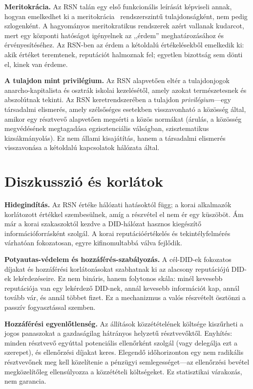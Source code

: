 \documentclass[11pt,a4paper,twocolumn]{article}
\begin{document}
\textbf{Meritokrácia.} Az RSN talán egy első funkcionális leírását képviseli annak, hogyan emelkedhet ki a meritokrácia~\cite{young1958} rendszerszintű tulajdonságként, nem pedig szlogenként. A hagyományos meritokratikus rendszerek azért vallanak kudarcot, mert egy központi hatóságot igényelnek az ,,érdem'' meghatározásához és érvényesítéséhez. Az RSN-ben az érdem a kétoldalú értékelésekből emelkedik ki: akik értéket teremtenek, reputációt halmoznak fel; egyetlen bizottság sem dönti el, kinek van érdeme.

\textbf{A tulajdon mint privilégium.} Az RSN alapvetően eltér a tulajdonjogok anarcho-kapitalista és osztrák iskolai kezelésétől, amely azokat természetesnek és abszolútnak tekinti. Az RSN keretrendszerében a tulajdon \emph{privilégium}---egy társadalmi elismerés, amely szélsőséges esetekben visszavonható a közösség által, amikor egy résztvevő alapvetően megsérti a közös normákat (árulás, a közösség megvédésének megtagadása egzisztenciális válságban, szisztematikus kizsákmányolás). Ez nem állami kisajátítás, hanem a társadalmi elismerés visszavonása a kétoldalú kapcsolatok hálózata által.

\section{Diszkusszió és korlátok}

\textbf{Hidegindítás.} Az RSN értéke hálózati hatásoktól függ; a korai alkalmazók korlátozott értékkel szembesülnek, amíg a részvétel el nem ér egy küszöböt. Ám már a korai szakaszoktól kezdve a DID-hálózat hasznos kiegészítő információforrásként szolgál. A korai reputációértékelés és tekintélyfelmérés várhatóan fokozatosan, egyre kifinomultabbá válva fejlődik.

\textbf{Potyautas-védelem és hozzáférés-szabályozás.} A cél-DID-ek fokozatos díjakat és hozzáférési korlátozásokat szabhatnak ki az alacsony reputációjú DID-ek lekérdezéseire. Ez nem bináris, hanem folytonos skála: minél kevesebb reputációja van egy lekérdező DID-nek, annál kevesebb információt kap, annál tovább vár, és annál többet fizet. Ez a mechanizmus a valós részvételt ösztönzi a passzív fogyasztással szemben.

\textbf{Hozzáférési egyenlőtlenség.} Az állítások közzétételének költsége kiszűrheti a jogos panaszokat a gazdaságilag hátrányos helyzetű résztvevőktől. Enyhítés: minden résztvevő egyúttal potenciális ellenőrként szolgál (vagy delegálja ezt a szerepet), és ellenőrzési díjakat keres. Elegendő időhorizonton egy nem radikális résztvevőnek meg kell közelítenie a pénzügyi semlegességet---az ellenőrzési bevétel megközelítőleg ellensúlyozza a közzétételi költségeket. Ez statisztikai várakozás, nem garancia.
\end{document}
